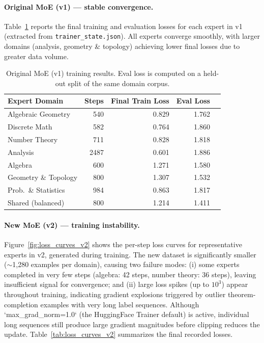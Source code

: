 \documentclass[11pt,a4paper]{article}
\begin{document}
\paragraph{Original MoE (v1) — stable convergence.}
Table~\ref{tab:loss_curves_v1} reports the final training and evaluation losses for each expert in v1 (extracted from \texttt{trainer\_state.json}). All experts converge smoothly, with larger domains (analysis, geometry \& topology) achieving lower final losses due to greater data volume.

\begin{table}[t]
\centering
\caption{Original MoE (v1) training results. Eval loss is computed on a held-out split of the same domain corpus.}
\label{tab:loss_curves_v1}
\small
\begin{tabular}{@{}lrrrr@{}}
\toprule
\textbf{Expert Domain} & \textbf{Steps} & \textbf{Final Train Loss} & \textbf{Eval Loss} \\
\midrule
Algebraic Geometry & 540  & 0.829 & 1.762 \\
Discrete Math      & 582  & 0.764 & 1.860 \\
Number Theory      & 711  & 0.828 & 1.818 \\
Analysis           & 2487 & 0.601 & 1.886 \\
Algebra            & 600  & 1.271 & 1.580 \\
Geometry \& Topology & 800 & 1.307 & 1.532 \\
Prob.\ \& Statistics & 984 & 0.863 & 1.817 \\
Shared (balanced)  & 800  & 1.214 & 1.411 \\
\bottomrule
\end{tabular}
\end{table}

\paragraph{New MoE (v2) — training instability.}
Figure~\ref{fig:loss_curves_v2} shows the per-step loss curves for representative experts in v2, generated during training. The new dataset is significantly smaller (${\sim}$1{,}280 examples per domain), causing two failure modes: (i) some experts completed in very few steps (algebra: 42 steps, number theory: 36 steps), leaving insufficient signal for convergence; and (ii) large loss spikes (up to $10^3$) appear throughout training, indicating gradient explosions triggered by outlier theorem-completion examples with very long label sequences. Although `max\_grad\_norm=1.0` (the HuggingFace Trainer default) is active, individual long sequences still produce large gradient magnitudes before clipping reduces the update. Table~\ref{tab:loss_curves_v2} summarizes the final recorded losses.
\end{document}
